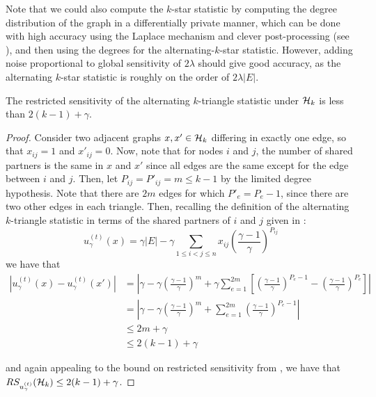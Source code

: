 Note that we could also compute the $k$-star statistic by computing the degree distribution of the graph in a differentially private manner, which can be done with high accuracy using the Laplace mechanism and clever post-processing (see \cite{HLMJ09}), and then using the degrees for the alternating-$k$-star statistic. However, adding noise proportional to global sensitivity of $2\lambda$ should give good accuracy, as the alternating $k$-star statistic is roughly on the order of $2\lambda|E|$.

\begin{claim}
The restricted sensitivity of the alternating $k$-triangle statistic under $\mathcal{H}_k$ is less than $2(k-1) + \gamma$.
\end{claim}
\begin{proof}
Consider two adjacent graphs $x, x'\in \mathcal{H}_k$ differing in exactly one edge, so that $x_{ij} = 1$ and $x'_{ij} = 0$. Now, note that for nodes $i$ and $j$, the number of shared partners is the same in $x$ and $x'$ since all edges are the same except for the edge between $i$ and $j$. Then, let $P_{ij} = P'_{ij} = m \leq k-1$ by the limited degree hypothesis. Note that there are $2m$ edges for which $P'_{e} = P_{e} - 1$, since there are two other edges in each triangle. Then, recalling the definition of the alternating $k$-triangle statistic in terms of the shared partners of $i$ and $j$ given in :
$$
u_\gamma^{(t)}(x) = \gamma |E| - \gamma \sum_{1 \leq i < j \leq n} x_{ij} \left(\frac{\gamma-1}{\gamma} \right)^{P_{ij}}
$$
we have that 
\begin{align*}
|u_\gamma^{(t)}(x) - u_\gamma^{(t)}(x')| &= \left|\gamma - \gamma \left(\frac{\gamma-1}{\gamma} \right)^{m}  + \gamma\sum_{e= 1}^{2m}  \left[\left(\frac{\gamma-1}{\gamma} \right)^{P_e-1}  - \left(\frac{\gamma-1}{\gamma} \right)^{P_e}\right]    \right|\\
& = \left|\gamma - \gamma \left(\frac{\gamma-1}{\gamma} \right)^{m}  + \sum_{e= 1}^{2m}  \left(\frac{\gamma-1}{\gamma} \right)^{P_e-1}   \right|\\
& \leq 2m + \gamma\\ 
& \leq 2(k-1) + \gamma 
\end{align*}

and again appealing to the bound on restricted sensitivity from , we have that $RS_{u_\gamma^{(t)}}(\mathcal{H}_k) \leq 2(k-1) + \gamma$.
\end{proof}

